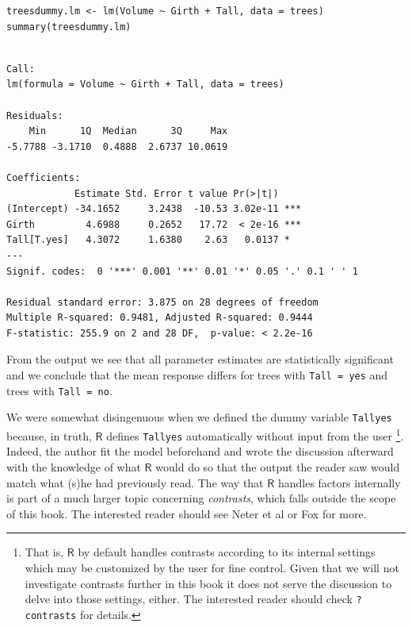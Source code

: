 \documentclass[captions=tableheading]{scrbook}
\begin{document}
\begin{verbatim}
treesdummy.lm <- lm(Volume ~ Girth + Tall, data = trees)
summary(treesdummy.lm)
\end{verbatim}


\begin{verbatim}

Call:
lm(formula = Volume ~ Girth + Tall, data = trees)

Residuals:
    Min      1Q  Median      3Q     Max 
-5.7788 -3.1710  0.4888  2.6737 10.0619 

Coefficients:
            Estimate Std. Error t value Pr(>|t|)    
(Intercept) -34.1652     3.2438  -10.53 3.02e-11 ***
Girth         4.6988     0.2652   17.72  < 2e-16 ***
Tall[T.yes]   4.3072     1.6380    2.63   0.0137 *  
---
Signif. codes:  0 '***' 0.001 '**' 0.01 '*' 0.05 '.' 0.1 ' ' 1 

Residual standard error: 3.875 on 28 degrees of freedom
Multiple R-squared: 0.9481,	Adjusted R-squared: 0.9444 
F-statistic: 255.9 on 2 and 28 DF,  p-value: < 2.2e-16
\end{verbatim}

From the output we see that all parameter estimates are statistically significant and we conclude that the mean response differs for trees with \texttt{Tall = yes} and trees with \texttt{Tall = no}.

\begin{rem}
We were somewhat disingenuous when we defined the dummy variable \texttt{Tallyes} because, in truth, \(\mathsf{R}\) defines \texttt{Tallyes} automatically without input from the user
\footnote{That is, \(\mathsf{R}\) by default handles contrasts according to its internal settings which may be customized by the user for fine control. Given that we will not investigate contrasts further in this book it does not serve the discussion to delve into those settings, either. The interested reader should check \texttt{?contrasts} for details.}. 
Indeed, the author fit the model beforehand and wrote the discussion afterward with the knowledge of what \(\mathsf{R}\) would do so that the output the reader saw would match what (s)he had previously read. The way that \(\mathsf{R}\) handles factors internally is part of a much larger topic concerning \emph{contrasts}, which falls outside the scope of this book. The interested reader should see Neter et al \cite{Neter1996} or Fox \cite{Fox1997} for more. 
\end{rem}
\end{document}
